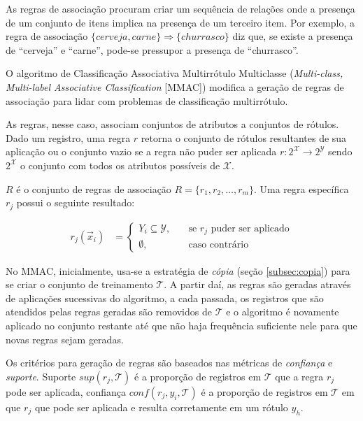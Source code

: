 \documentclass[runningheads,a4paper]{llncs}
\begin{document}
As regras de associação procuram criar um sequência de relações onde a presença de um conjunto de itens implica na presença de um terceiro item. Por exemplo, a regra de associação $\{ cerveja, carne \} \Rightarrow \{ churrasco \}$ diz que, se existe a presença de \enquote{cerveja} e \enquote{carne}, pode-se pressupor a presença de \enquote{churrasco}.

O algoritmo de Classificação Associativa Multirrótulo Multiclasse (\textit{Multi-class, Multi-label Associative Classification} [MMAC]) \cite{Thabtah2004-vz} modifica a geração de regras de associação para lidar com problemas de classificação multirrótulo.

As regras, nesse caso, associam conjuntos de atributos a conjuntos de rótulos.
Dado um registro, uma regra $r$ retorna o conjunto de rótulos resultantes de sua aplicação ou o conjunto vazio se a regra não puder ser aplicada $r : 2^\mathcal{X} \to 2^\mathcal{Y}$ sendo $2^\mathcal{X}$ o conjunto com todos os atributos possíveis de $\mathcal{X}$. 

$R$ é o conjunto de regras de associação $R = \{ r_1, r_2, \dots, r_m \}$. Uma regra específica $r_j$ possui o seguinte resultado:

\begin{align*}
	r_j(\vec{x}_i) &= \begin{cases}
						 Y_i \subseteq \mathcal{Y}, & \quad \text{se $r_j$ puder ser aplicado} \\
			             \emptyset, & \quad \text{caso contrário}
		            \end{cases}
\end{align*}

No MMAC, inicialmente, usa-se a estratégia de \textit{cópia} (seção \ref{subsec:copia}) para se criar o conjunto de treinamento $\mathcal{T}$. A partir daí, as regras são geradas através de aplicações sucessivas do algoritmo, a cada passada, os registros que são atendidos pelas regras geradas são removidos de $\mathcal{T}$ e o algoritmo é novamente aplicado no conjunto restante até que não haja frequência suficiente nele para que novas regras sejam geradas.

Os critérios para geração de regras são baseados nas métricas de \textit{confiança} e \textit{suporte}. Suporte $sup(r_j, \mathcal{T})$ é a proporção de registros em $\mathcal{T}$ que a regra $r_j$ pode ser aplicada, confiança $conf(r_j, y_i, \mathcal{T})$ é a proporção de registros em $\mathcal{T}$ em que $r_j$ que pode ser aplicada e resulta corretamente em um rótulo $y_h$.
\end{document}
